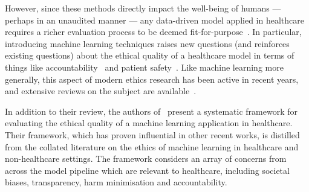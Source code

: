 However, since these methods directly impact the well-being of humans ---
perhaps in an unaudited manner --- any data-driven model applied in healthcare
requires a richer evaluation process to be deemed
fit-for-purpose~\cite{Gerhards2020,Ho2020}. In particular, introducing machine
learning techniques raises new questions (and reinforces existing questions)
about the ethical quality of a healthcare model in terms of things like
accountability~\cite{McCradden2020accountability,Ross2017,Zawati2020} and
patient safety~\cite{Habli2020,McCradden2020safety,Sittig2015}. Like machine
learning more generally, this aspect of modern ethics research has been active
in recent years, and extensive reviews on the subject are
available~\cite{Char2020,Findley2020,Grote2020,Obermeyer2016,Rajkomar2019}.

In addition to their review, the authors of~\cite{Char2020} present a systematic
framework for evaluating the ethical quality of a machine learning application
in healthcare. Their framework, which has proven influential in other recent
works, is distilled from the collated literature on the ethics of machine
learning in healthcare and non-healthcare settings. The framework considers an
array of concerns from across the model pipeline which are relevant to
healthcare, including societal biases, transparency, harm minimisation and
accountability.

